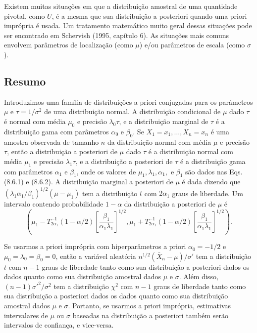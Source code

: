 Existem muitas situações em que a distribuição amostral de uma quantidade pivotal, como $U$, é a mesma que sua distribuição a posteriori quando uma priori imprópria é usada. Um tratamento matemático muito geral dessas situações pode ser encontrado em Schervish (1995, capítulo 6). As situações mais comuns envolvem parâmetros de localização (como $\mu$) e/ou parâmetros de escala (como $\sigma$).

\subsection*{Resumo}

Introduzimos uma família de distribuições a priori conjugadas para os parâmetros $\mu$ e $\tau = 1/\sigma^2$ de uma distribuição normal. A distribuição condicional de $\mu$ dado $\tau$ é normal com média $\mu_0$ e precisão $\lambda_0\tau$, e a distribuição marginal de $\tau$ é a distribuição gama com parâmetros $\alpha_0$ e $\beta_0$. Se $X_1 = x_1, \dots, X_n = x_n$ é uma amostra observada de tamanho $n$ da distribuição normal com média $\mu$ e precisão $\tau$, então a distribuição a posteriori de $\mu$ dado $\tau$ é a distribuição normal com média $\mu_1$ e precisão $\lambda_1\tau$, e a distribuição a posteriori de $\tau$ é a distribuição gama com parâmetros $\alpha_1$ e $\beta_1$, onde os valores de $\mu_1, \lambda_1, \alpha_1,$ e $\beta_1$ são dados nas Eqs. (8.6.1) e (8.6.2). A distribuição marginal a posteriori de $\mu$ é dada dizendo que $(\lambda_1\alpha_1/\beta_1)^{1/2}(\mu - \mu_1)$ tem a distribuição $t$ com $2\alpha_1$ graus de liberdade. Um intervalo contendo probabilidade $1-\alpha$ da distribuição a posteriori de $\mu$ é
\[
\left( \mu_1 - T_{2\alpha_1}^{-1}(1-\alpha/2)\left[\frac{\beta_1}{\alpha_1\lambda_1}\right]^{1/2}, \mu_1 + T_{2\alpha_1}^{-1}(1-\alpha/2)\left[\frac{\beta_1}{\alpha_1\lambda_1}\right]^{1/2} \right).
\]

Se usarmos a priori imprópria com hiperparâmetros a priori $\alpha_0 = -1/2$ e $\mu_0 = \lambda_0 = \beta_0 = 0$, então a variável aleatória $n^{1/2}(\bar{X}_n - \mu)/\sigma'$ tem a distribuição $t$ com $n-1$ graus de liberdade tanto como sua distribuição a posteriori dados os dados quanto como sua distribuição amostral dados $\mu$ e $\sigma$. Além disso, $(n-1)\sigma'^2/\sigma^2$ tem a distribuição $\chi^2$ com $n-1$ graus de liberdade tanto como sua distribuição a posteriori dados os dados quanto como sua distribuição amostral dados $\mu$ e $\sigma$. Portanto, se usarmos a priori imprópria, estimativas intervalares de $\mu$ ou $\sigma$ baseadas na distribuição a posteriori também serão intervalos de confiança, e vice-versa.

